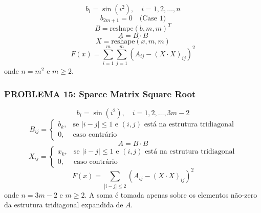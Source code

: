 \documentclass[12pt,a4paper]{article}
\begin{document}
\begin{equation}
b_i = \sin(i^2), \quad i = 1, 2, \ldots, n
\end{equation}
\begin{equation}
b_{2m+1} = 0 \quad \text{(Case 1)}
\end{equation}
\begin{equation}
B = \text{reshape}(b, m, m)^T
\end{equation}
\begin{equation}
A = B \cdot B
\end{equation}
\begin{equation}
X = \text{reshape}(x, m, m)
\end{equation}
\begin{equation}
F(x) = \sum_{i=1}^{m} \sum_{j=1}^{m} (A_{ij} - (X \cdot X)_{ij})^2
\end{equation}
onde $n = m^2$ e $m \geq 2$.


\subsubsection{\textbf{PROBLEMA 15: Sparce Matrix Square Root}}

\begin{equation}
b_i = \sin(i^2), \quad i = 1, 2, \ldots, 3m-2
\end{equation}
\begin{equation}
B_{ij} = \begin{cases}
b_{k}, & \text{se } |i-j| \leq 1 \text{ e } (i,j) \text{ está na estrutura tridiagonal} \\
0, & \text{caso contrário}
\end{cases}
\end{equation}
\begin{equation}
A = B \cdot B
\end{equation}
\begin{equation}
X_{ij} = \begin{cases}
x_{k}, & \text{se } |i-j| \leq 1 \text{ e } (i,j) \text{ está na estrutura tridiagonal} \\
0, & \text{caso contrário}
\end{cases}
\end{equation}
\begin{equation}
F(x) = \sum_{|i-j| \leq 2} (A_{ij} - (X \cdot X)_{ij})^2
\end{equation}
onde $n = 3m-2$ e $m \geq 2$. A soma é tomada apenas sobre os elementos não-zero da estrutura tridiagonal expandida de $A$.
\end{document}
